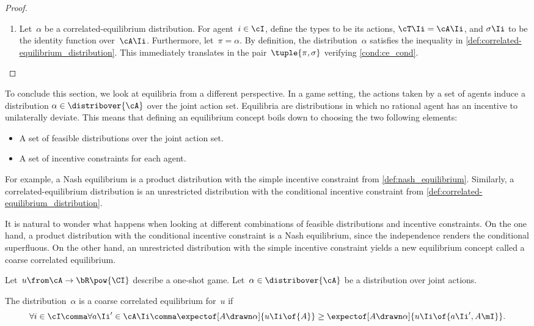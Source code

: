 \begin{proof}
\begin{enumerate}
\item
Let~\(\alpha\) be a correlated-equilibrium distribution.
For agent~\(i \in \cI\), define the types to be its actions, \(\cT\Ii = \cA\Ii\), and \(\sigma\Ii\) to be the identity function over~\(\cA\Ii\).
Furthermore, let~\(\pi = \alpha\).
By definition, the distribution~\(\alpha\) satisfies the inequality in \cref{def:correlated-equilibrium_distribution}.
This immediately translates in the pair~\(\tuple{\pi, \sigma}\) verifying \cref{cond:ce_cond}.
\end{enumerate}
\end{proof}

To conclude this section, we look at equilibria from a different perspective.
In a game setting, the actions taken by a set of agents induce a distribution \(\alpha \in \distribover{\cA}\) over the joint action set.
Equilibria are distributions in which no rational agent has an incentive to unilaterally deviate.
This means that defining an equilibrium concept boils down to choosing the two following elements:
\begin{itemize}
\item A set of feasible distributions over the joint action set.
\item A set of incentive constraints for each agent.
\end{itemize}

For example, a Nash equilibrium is a product distribution with the simple incentive constraint from \cref{def:nash_equilibrium}.
Similarly, a correlated-equilibrium distribution is an unrestricted distribution with the conditional incentive constraint from \cref{def:correlated-equilibrium_distribution}.

It is natural to wonder what happens when looking at different combinations of feasible distributions and incentive constraints.
On the one hand, a product distribution with the conditional incentive constraint is a Nash equilibrium, since the independence renders the conditional superfluous.
On the other hand, an unrestricted distribution with the simple incentive constraint yields a new equilibrium concept called a coarse correlated equilibrium.

\begin{definition}
Let~\(u \from \cA \to \bR\pow{\CI}\) describe a one-shot game.
Let~\(\alpha \in \distribover{\cA}\) be a distribution over joint actions.

The distribution~\(\alpha\) is a coarse correlated equilibrium for~\(u\) if
\[
\forall i \in \cI \comma
\forall a\Ii' \in \cA\Ii \comma
\expectof[A \drawn \alpha]{u\Ii \of{A}}
\ge
\expectof[A \drawn \alpha]{u\Ii \of{a\Ii', A\mI}}
.
\]
\end{definition}

